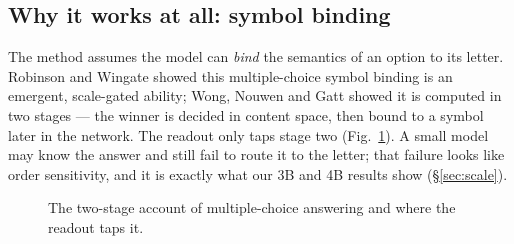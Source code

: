 \documentclass[11pt,a4paper]{article}
\newcommand{\code}[1]{\texttt{#1}}
\begin{document}
\subsection{Why it works at all: symbol binding}
The method assumes the model can \emph{bind} the semantics of an option to its letter. Robinson and Wingate \cite{mcsb} showed this multiple-choice symbol binding is an emergent, scale-gated ability; Wong, Nouwen and Gatt \cite{twostage} showed it is computed in two stages --- the winner is decided in content space, then bound to a symbol later in the network. The readout only taps stage two (Fig.~\ref{fig:twostage}). A small model may know the answer and still fail to route it to the letter; that failure looks like order sensitivity, and it is exactly what our 3B and 4B results show (\S\ref{sec:scale}).

\begin{figure}[H]
\centering
{}
\caption{The two-stage account of multiple-choice answering \cite{twostage} and where the readout taps it.}
\label{fig:twostage}
\end{figure}
\end{document}

